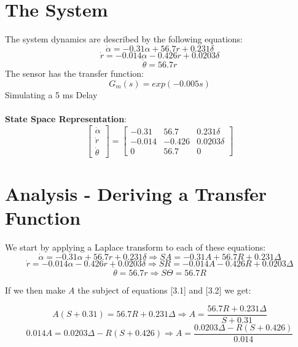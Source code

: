 \documentclass{article}
\numberwithin{equation}{section}
\begin{document}
\section{The System}
The system dynamics are described by the following equations:
\begin{equation}
    \dot{\alpha}=-0.31\alpha + 56.7r + 0.231\delta
\end{equation}
\begin{equation}
    \dot{r}=-0.014\alpha - 0.426r +0.0203\delta
\end{equation}
\begin{equation}
    \dot{\theta} = 56.7r
\end{equation}
%
%
%
The sensor has the transfer function:
\begin{equation}
G_m(s) = exp(-0.005s)    
\end{equation}
Simulating a 5 ms Delay\\\\
%
\textbf{State Space Representation}:
\[
\begin{bmatrix} \dot{\alpha} \\ \dot{r} \\ \dot{\theta} \end{bmatrix} = \begin{bmatrix} -0.31 & 56.7 & 0.231\delta \\ -0.014 & -0.426 & 0.0203\delta \\ 0 & 56.7 & 0 \end{bmatrix} 
\]


\newpage
\section{Analysis - Deriving a Transfer Function}
We start by applying a Laplace transform to each of these equations:
\begin{equation}
\dot{\alpha} = -0.31\alpha + 56.7r + 0.231\delta \Rightarrow SA = -0.31A + 56.7R + 0.231\Delta
\end{equation}
\begin{equation}
\dot{r} = -0.014\alpha - 0.426r +0.0203\delta \Rightarrow SR = -0.014A - 0.426R +0.0203\Delta
\end{equation}
\begin{equation}
\dot{\theta} = 56.7r \Rightarrow S\Theta = 56.7R
\end{equation}

If we then make \(A\) the subject of equations [3.1] and [3.2] we get:

\begin{equation}
A(S + 0.31) = 56.7R + 0.231 \Delta \Rightarrow A = \frac{56.7R + 0.231 \Delta}{S + 0.31}
\end{equation}
\begin{equation}
0.014A = 0.0203\Delta - R(S + 0.426) \Rightarrow A = \frac{0.0203\Delta - R(S + 0.426)}{0.014}
\end{equation}
\end{document}
